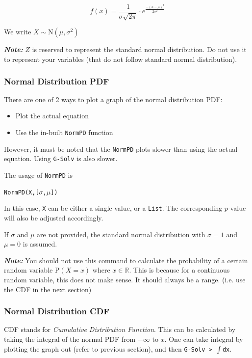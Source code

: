 \documentclass[a5paper,draft]{memoir}
\def\code#1{\texttt{#1}}
\def\note#1{\textbf{\textit{Note:}} #1}
\newcommand{\addtoindex}[1]{#1\index{#1}}
\begin{document}
\begin{equation}
	f(x)=\frac{1}{\sigma\sqrt{2\pi}} \cdot e^{\frac{-(x-\mu)^2}{2\sigma^2}}
\end{equation}

We write $X \sim \mathrm{N} (\mu,\sigma^2)$

\note{$Z$ is reserved to represent the standard normal distribution. Do not use it to represent your variables (that do not follow standard normal distribution).}

\subsubsection{Normal Distribution PDF}
There are one of 2 ways to plot a graph of the normal distribution PDF:

\begin{itemize}
	\item Plot the actual equation
	\item Use the in-built \code{NormPD} function
\end{itemize}

However, it must be noted that the \code{NormPD} plots slower than using the actual equation. Using \code{G-Solv} is also slower.

The usage of \code{\addtoindex{NormPD}} is 
\begin{center}
	\code{NormPD(X,[$\sigma$,$\mu$])}
\end{center}

In this case, \code{X} can be either a single value, or a \code{List}. The corresponding $p$-value will also be adjusted accordingly.

If $\sigma$ and $\mu$ are not provided, the standard normal distribution with $\sigma=1$ and $\mu=0$ is assumed.

\note{You should not use this command to calculate the probability of a certain random variable $\textrm{P}(X = x)$ where $x \in \mathbb{R}$. This is because for a continuous random variable, this does not make sense. It should always be a range. (i.e. use the CDF in the next section)}

\subsubsection{Normal Distribution CDF}
CDF stands for \textit{Cumulative Distribution Function}. This can be calculated by taking the integral of the normal PDF from $-\infty$ to $x$. One can take integral by plotting the graph out (refer to previous section), and then \code{G-Solv > $\int$dx}.
\end{document}
